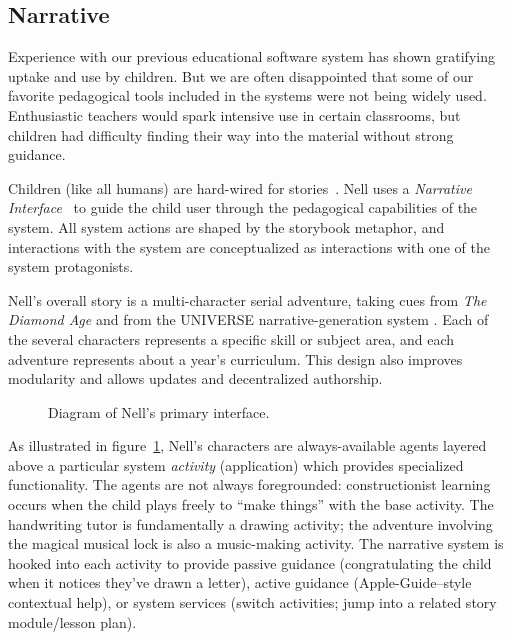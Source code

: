 \documentclass[preprint]{sig-alternate}
\begin{document}

\subsection{Narrative}

Experience with our previous educational software
system has shown gratifying uptake and
use by children.  But we are often disappointed that some of our
favorite pedagogical tools included in the systems were not being
widely used.  Enthusiastic teachers would spark intensive use in
certain classrooms, but children had difficulty finding their way into
the material without strong guidance.

Children (like all humans) are hard-wired for
stories~\cite{boyd:stories}.  Nell uses a
\textit{Narrative Interface}~\cite{bizzocchi:narrative,don:narrative}
to guide the child user through the pedagogical capabilities of the
system.  All system actions are shaped by the storybook metaphor, and
interactions with the system are conceptualized as interactions with
one of the system protagonists.

Nell's overall story is a multi-character serial adventure, taking
cues from \textit{The Diamond Age} and
from the UNIVERSE narrative-generation system \cite{lebowitz:universe85}.
Each of the several characters represents a specific skill or subject
area, and each adventure represents about a year's curriculum.  This
design also improves modularity and allows updates and decentralized
authorship.

\begin{figure}
\centering
{} %
\caption{Diagram of Nell's primary interface.}\label{fig:nell}
\end{figure}

As illustrated in figure~\ref{fig:nell}, Nell's characters are
always-available agents layered above a particular system \textit{activity}
(application) which provides specialized functionality.  The agents
are not always foregrounded: constructionist learning occurs when the
child plays freely to ``make things'' with the base activity.
The handwriting tutor is fundamentally a drawing activity; the
adventure involving the magical musical lock is also a music-making activity.
The narrative system is
hooked into each activity to provide passive guidance
(congratulating the child when it notices they've drawn a letter),
active guidance (Apple-Guide--style~\cite{powers:appleguide}
contextual help), or system services (switch activities; jump into a
related story module/lesson plan).
\end{document}

